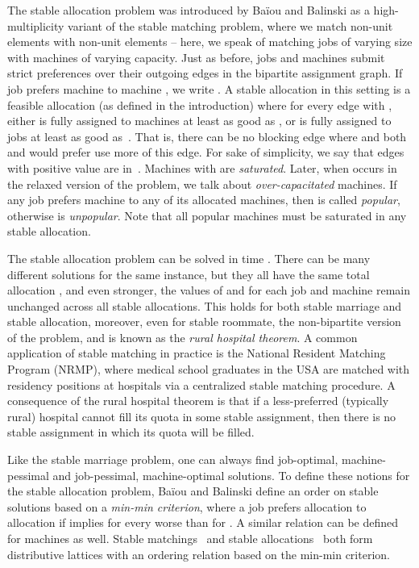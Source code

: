 \documentclass{llncs}
\begin{document}
 The stable allocation problem was
introduced by Ba\"iou and Balinski \cite{DBLP:journals/mor/BaiouB02}
as a high-multiplicity variant of the stable matching problem, where
we match non-unit elements with non-unit elements -- here, we speak of
matching jobs of varying size with machines of varying capacity.  Just
as before, jobs and machines submit strict preferences over their
outgoing edges in the bipartite assignment graph.  If job 
prefers machine  to machine , we write
.  A stable allocation in
this setting is a feasible allocation (as defined in the introduction)
where for every edge  with , either  is
fully assigned to machines at least as good as , or  is fully
assigned to jobs at least as good as~.  That is, there can be no
blocking edge  where  and both  and  would
prefer use more of this edge.  For sake of simplicity, we say that
edges with positive  value are in~. Machines with 
are \emph{saturated}. Later, when  occurs in the relaxed
version of the problem, we talk about \emph{over-capacitated}
machines. If any job prefers machine  to any of its allocated
machines, then  is called \emph{popular}, otherwise  is
\emph{unpopular}. Note that all popular machines must be saturated in
any stable allocation.

The stable allocation problem can be solved in  time
\cite{DBLP:journals/algorithmica/DeanM10}.  There can be many
different solutions for the same instance, but they all have the same
total allocation , and even stronger, the values of  and
 for each job and machine remain unchanged across all stable
allocations.  This holds for both stable marriage and stable
allocation, moreover, even for stable roommate, the non-bipartite version of the problem, and is known as the {\em rural hospital theorem}.  A
common application of stable matching in practice is the National
Resident Matching Program (NRMP), where medical school graduates in
the USA are matched with residency positions at hospitals via a
centralized stable matching procedure.  A consequence of the rural
hospital theorem is that if a less-preferred (typically rural)
hospital cannot fill its quota in some stable assignment, then there
is no stable assignment in which its quota will be filled.

Like the stable marriage problem, one can always find job-optimal,
machine-pessimal and job-pessimal, machine-optimal solutions.  To
define these notions for the stable allocation problem, Ba\"iou and
Balinski \cite{DBLP:journals/mor/BaiouB02} define an order on stable
solutions based on a {\em min-min criterion}, where a job  prefers
allocation  to allocation  if  implies
 for every  worse than  for .  A similar
relation can be defined for machines as well.  Stable
matchings~\cite{Knuth:1976:MSR} and stable
allocations~\cite{DBLP:journals/mor/BaiouB02} both form distributive
lattices with an ordering relation based on the min-min criterion.
\end{document}
